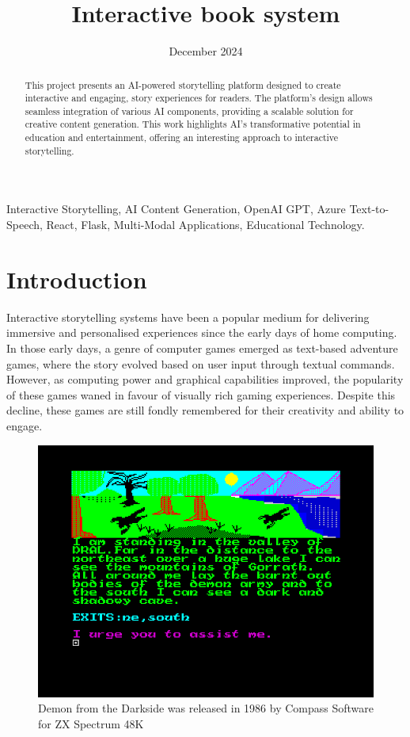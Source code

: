 \documentclass[conference]{IEEEtran}
\begin{document}
	
	\title{Interactive book system}
	
	\author{
		\date{December 2024}
	}
	
	\maketitle
	
	\begin{abstract}
		This project presents an AI-powered storytelling platform designed to create interactive and engaging, story experiences for readers. The platform's design allows seamless integration of various AI components, providing a scalable solution for creative content generation. This work highlights AI's transformative potential in education and entertainment, offering an interesting approach to interactive storytelling.
	\end{abstract}
	
	\begin{IEEEkeywords}
		Interactive Storytelling, AI Content Generation, OpenAI GPT, Azure Text-to-Speech, React, Flask, Multi-Modal Applications, Educational Technology.
	\end{IEEEkeywords}
	
	\section{Introduction}
	
	Interactive storytelling systems have been a popular medium for delivering immersive and personalised experiences since the early days of home computing. In those early days, a genre of computer games emerged as text-based adventure games, where the story evolved based on user input through textual commands\cite{brooker2021filling}\cite{woodcock2012zx}. However, as computing power and graphical capabilities improved, the popularity of these games waned in favour of visually rich gaming experiences. Despite this decline, these games are still fondly remembered for their creativity and ability to engage.
		
	\begin{figure}[!h]
		\centering
		\includegraphics[width=0.7\linewidth]{img/img-ari3333-project-report-adventure-games}
		\caption{Demon from the Darkside was released in 1986 by Compass Software for ZX Spectrum 48K\cite{demonfromdarkside2024}}
		\label{fig:img-ari3333-project-report-adventure-games}
	\end{figure}
		
\end{document}
